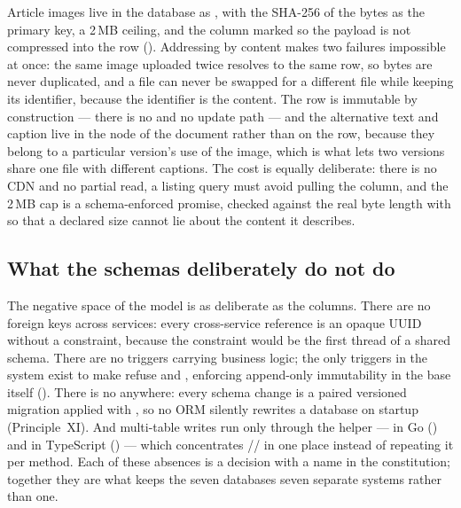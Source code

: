 Article images live in the database as , with the SHA-256 of the
bytes as the primary key, a 2\,MB ceiling, and the column marked
 so the payload is not compressed into the row
().
Addressing by content makes two failures impossible at once: the same image
uploaded twice resolves to the same row, so bytes are never duplicated, and a
file can never be swapped for a different file while keeping its identifier,
because the identifier is the content. The row is immutable by construction ---
there is no  and no update path --- and the alternative text and
caption live in the  node of the document rather than on the row,
because they belong to a particular version's use of the image, which is what
lets two versions share one file with different captions. The cost is equally
deliberate: there is no CDN and no partial read, a listing query must avoid
pulling the  column, and the 2\,MB cap is a schema-enforced promise,
checked against the real byte length with 
so that a declared size cannot lie about the content it describes.

\subsection{What the schemas deliberately do not do}

The negative space of the model is as deliberate as the columns. There are no
foreign keys across services: every cross-service reference is an opaque UUID
without a constraint, because the constraint would be the first thread of a
shared schema. There are no triggers carrying business logic; the only triggers
in the system exist to make  refuse  and
, enforcing append-only immutability in the base itself
().
There is no  anywhere: every schema change is a paired
versioned migration applied with , so no ORM silently
rewrites a database on startup (Principle~XI). And multi-table writes run only
through the  helper --- in Go
() and in TypeScript
() --- which concentrates
// in one place instead of repeating it
per method. Each of these absences is a decision with a name in the
constitution; together they are what keeps the seven databases seven separate
systems rather than one.

